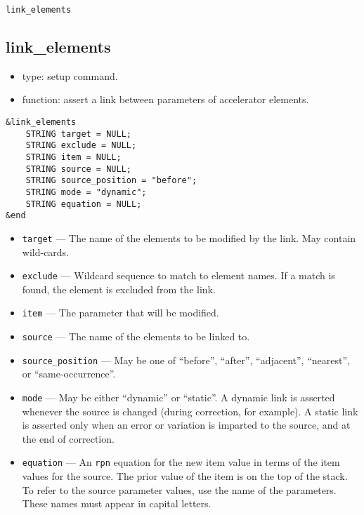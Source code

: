 \documentclass[11pt]{article}
\begin{document}
\begin{latexonly}
\newpage
\begin{center}{\Large\verb|link_elements|}\end{center}
\end{latexonly}
\subsection{link\_elements}

\begin{itemize}
\item type: setup command.
\item function: assert a link between parameters of accelerator elements.
\end{itemize}

\begin{verbatim}
&link_elements
    STRING target = NULL;
    STRING exclude = NULL;
    STRING item = NULL;
    STRING source = NULL;
    STRING source_position = "before";
    STRING mode = "dynamic";
    STRING equation = NULL;
&end
\end{verbatim}

\begin{itemize}
\item \verb|target| --- The name of the elements to be modified by the link.  May contain
 wild-cards.
\item \verb|exclude| --- Wildcard sequence to match to element names.  If a match is found,
 the element is excluded from the link.
\item \verb|item| --- The parameter that will be modified.
\item \verb|source| --- The name of the elements to be linked to.
\item \verb|source_position| --- May be one of ``before'', ``after'', 
``adjacent'', ``nearest'', or ``same-occurrence''.
\item \verb|mode| --- May be either ``dynamic'' or ``static''.  A dynamic link
is asserted whenever the source is changed (during correction, for example).  
A static link is asserted only when an error or variation is imparted to
the source, and at the end of correction.
\item \verb|equation| --- An {\tt rpn} equation for the new item value in
terms of the item values for the source.  The prior value of the item is 
on the top of the stack. To refer to the source
parameter values, use the name of the parameters. These names must appear
in capital letters.  
\end{itemize}
\end{document}
